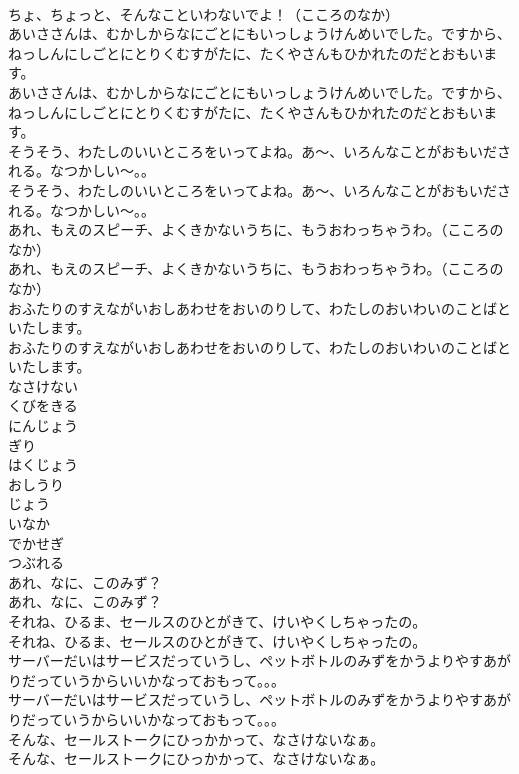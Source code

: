 \documentclass[8pt]{extreport}
\begin{document}
\begin{CJK}{UTF8}{min}
\\	ちょ、ちょっと、そんなこといわないでよ！（こころのなか）
\\	あいささんは、むかしからなにごとにもいっしょうけんめいでした。ですから、ねっしんにしごとにとりくむすがたに、たくやさんもひかれたのだとおもいます。
\\	あいささんは、むかしからなにごとにもいっしょうけんめいでした。ですから、ねっしんにしごとにとりくむすがたに、たくやさんもひかれたのだとおもいます。
\\	そうそう、わたしのいいところをいってよね。あ～、いろんなことがおもいだされる。なつかしい～。。
\\	そうそう、わたしのいいところをいってよね。あ～、いろんなことがおもいだされる。なつかしい～。。
\\	あれ、もえのスピーチ、よくきかないうちに、もうおわっちゃうわ。（こころのなか）
\\	あれ、もえのスピーチ、よくきかないうちに、もうおわっちゃうわ。（こころのなか）
\\	おふたりのすえながいおしあわせをおいのりして、わたしのおいわいのことばといたします。
\\	おふたりのすえながいおしあわせをおいのりして、わたしのおいわいのことばといたします。
\\	なさけない
\\	くびをきる
\\	にんじょう
\\	ぎり
\\	はくじょう
\\	おしうり
\\	じょう
\\	いなか
\\	でかせぎ
\\	つぶれる
\\	あれ、なに、このみず？
\\	あれ、なに、このみず？
\\	それね、ひるま、セールスのひとがきて、けいやくしちゃったの。
\\	それね、ひるま、セールスのひとがきて、けいやくしちゃったの。
\\	サーバーだいはサービスだっていうし、ペットボトルのみずをかうよりやすあがりだっていうからいいかなっておもって。。。
\\	サーバーだいはサービスだっていうし、ペットボトルのみずをかうよりやすあがりだっていうからいいかなっておもって。。。
\\	そんな、セールストークにひっかかって、なさけないなぁ。
\\	そんな、セールストークにひっかかって、なさけないなぁ。

\end{CJK}
\end{document}
